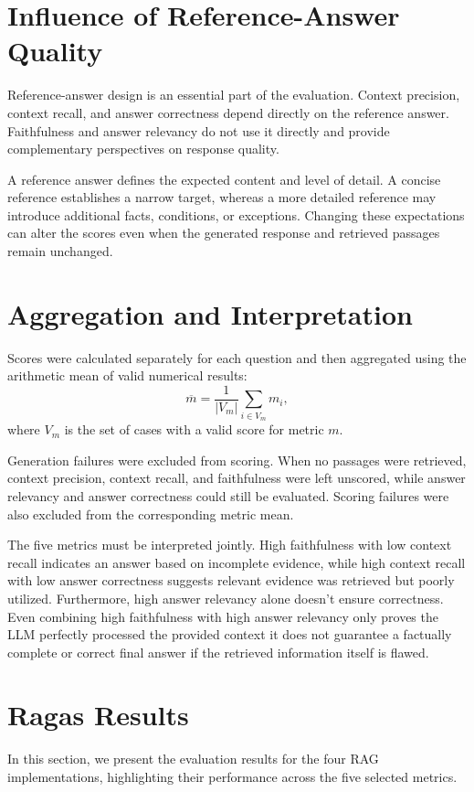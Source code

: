 \documentclass[a4paper,12pt]{report}
\begin{document}
\section{Influence of Reference-Answer Quality}
\label{sec:reference_quality}

Reference-answer design is an essential part of the evaluation.
Context precision, context recall, and answer correctness depend
directly on the reference answer. Faithfulness and answer relevancy
do not use it directly and provide complementary perspectives on
response quality.

A reference answer defines the expected content and level of detail.
A concise reference establishes a narrow target, whereas a more
detailed reference may introduce additional facts, conditions, or
exceptions. Changing these expectations can alter the scores even
when the generated response and retrieved passages remain unchanged.


\section{Aggregation and Interpretation}
\label{sec:evaluation_interpretation}

Scores were calculated separately for each question and then
aggregated using the arithmetic mean of valid numerical results:
\[
\overline{m}
=
\frac{1}{|V_m|}
\sum_{i \in V_m} m_i,
\]
where $V_m$ is the set of cases with a valid score for metric $m$.

Generation failures were excluded from scoring. When no passages
were retrieved, context precision, context recall, and faithfulness
were left unscored, while answer relevancy and answer correctness
could still be evaluated. Scoring failures were also excluded from
the corresponding metric mean. 

The five metrics must be interpreted jointly. High faithfulness with low context recall indicates an answer based on incomplete evidence, while high context recall with low answer correctness suggests relevant evidence was retrieved but poorly utilized. Furthermore, high answer relevancy alone doesn't ensure correctness. Even combining high faithfulness with high answer relevancy only proves the LLM perfectly processed the provided context it does not guarantee a factually complete or correct final answer if the retrieved information itself is flawed.

\section{Ragas Results}
In this section, we present the evaluation results for the four RAG implementations, highlighting their performance across the five selected metrics. 
\end{document}
